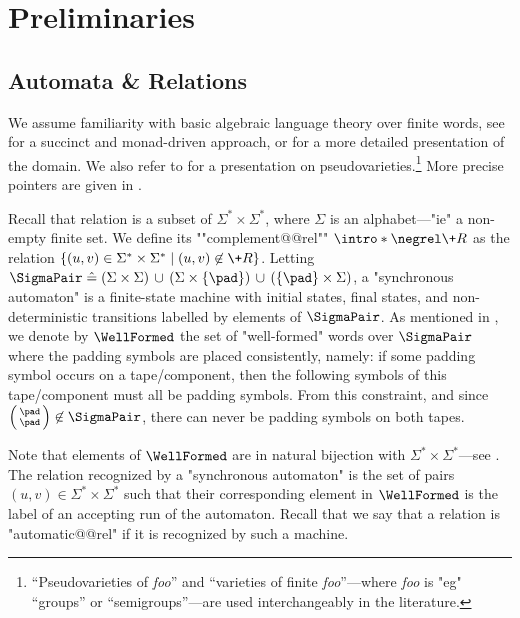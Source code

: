 \section{Preliminaries}
\label{sec:preliminaries}

\subsection{Automata \& Relations}

We assume familiarity with basic algebraic language theory over finite words, see \cite[\S~1, 2, 4, pp.~3--66 \& pp.~107--156]{Bojanczyk2020MSO} for a succinct and monad-driven approach, or \cite[\S~I--XIV, pp.~3--247]{Pin2022MathematicalFoundations} for a more detailed presentation of the domain.
We also refer to \cite{StraubingWeil2021Varieties} for a presentation on pseudovarieties.\footnote{``Pseudovarieties of \emph{foo}'' and ``varieties of finite \emph{foo}''---where \emph{foo} is "eg" ``groups''
or ``semigroups''---are used interchangeably in the literature.}
More precise pointers are given in .

Recall that relation is a subset of $\Sigma^*\times\Sigma^*$,
where $\Sigma$ is an alphabet---"ie" a non-empty finite set.
We define its \AP""complement@@rel"" \AP$\intro*\negrel \+R$ as the relation $\{(u,v) \in \Sigma^*\times \Sigma^* \mid (u,v) \not\in \+R\}$.
Letting
$\SigmaPair \defeq
(\Sigma \times \Sigma) \,\cup\,
(\Sigma \times \{\pad\}) \,\cup\,
(\{\pad\} \times \Sigma)$, a "synchronous automaton" is a finite-state machine with initial states, final states, and
non-deterministic transitions labelled by elements of $\SigmaPair$.
As mentioned in , we denote by $\WellFormed$ the set of "well-formed" words over $\SigmaPair$ where the padding symbols are placed consistently, namely: if some padding symbol occurs on a tape/component, then the following symbols of this tape/component must all be padding symbols.
From this constraint, and since $\pair{\pad}{\pad} \not\in \SigmaPair$,
there can never be padding symbols on both tapes.

Note that elements of $\WellFormed$ are in natural bijection with $\Sigma^*\times\Sigma^*$---see
.
The relation recognized by a "synchronous automaton" is the set of pairs $(u,v) \in \Sigma^*\times\Sigma^*$ such that their corresponding element in $\WellFormed$ is the label of
an accepting run of the automaton. Recall that we say that a relation is \AP"automatic@@rel" if it is recognized 
by such a machine.

